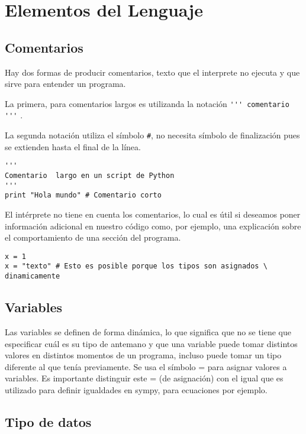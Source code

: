 \documentclass{article}
\begin{document}
\section{Elementos del Lenguaje}

\subsection{Comentarios}

Hay dos formas de producir comentarios, texto que el interprete  no ejecuta y que sirve para entender un programa.

La primera, para comentarios largos es utilizanda la notación \linebreak\verb~''' comentario '''~ .


 La segunda notación utiliza el símbolo \verb~#~, no necesita símbolo de finalización pues se extienden hasta el final de la línea.

 \begin{lstlisting}
'''
Comentario  largo en un script de Python
'''
print "Hola mundo" # Comentario corto
\end{lstlisting}

El intérprete no tiene en cuenta los comentarios, lo cual es útil si deseamos poner información adicional en nuestro código como, por ejemplo, una explicación sobre el comportamiento de una sección del programa.






\begin{lstlisting}
x = 1
x = "texto" # Esto es posible porque los tipos son asignados \
dinamicamente
\end{lstlisting}



\subsection{Variables}
Las variables se definen de forma dinámica, lo que significa que no se tiene que especificar cuál es su tipo de antemano y que una variable puede tomar distintos valores en distintos momentos de un programa, incluso puede tomar
 un tipo diferente al que tenía previamente. Se usa el símbolo = para asignar valores a variables. Es importante distinguir este = (de asignación) con el igual que es utilizado para definir igualdades en sympy, para ecuaciones por ejemplo.




\subsection{Tipo de datos}
\end{document}
